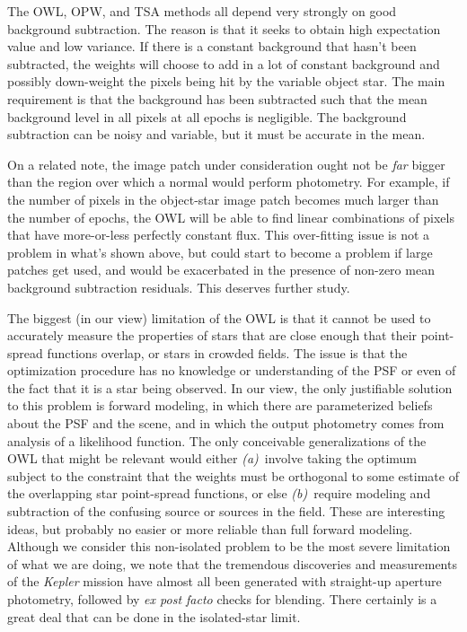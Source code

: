 \documentclass[12pt, letterpaper, preprint]{aastex}
\newcommand{\project}[1]{\textsl{#1}}
\newcommand{\foreign}[1]{\textsl{#1}}
\begin{document}
The OWL, OPW, and TSA methods all depend very strongly on good background subtraction.
The reason is that it seeks to obtain high expectation value and low variance.
If there is a constant background that hasn't been subtracted,
  the weights will choose to add in a lot of constant background
  and possibly down-weight the pixels being hit by the variable object star.
The main requirement is that the background has been subtracted such
  that the mean background level in all pixels at all epochs is negligible.
The background subtraction can be noisy and variable,
  but it must be accurate in the mean.

On a related note, the image patch under consideration ought not be \emph{far}
  bigger than the region over which a normal would perform photometry.
For example, if the number of pixels in the object-star image patch becomes
  much larger than the number of epochs,
  the OWL will be able to find linear combinations of pixels that have
  more-or-less perfectly constant flux.
This over-fitting issue is not a problem in what's shown above,
  but could start to become a problem if large patches get used,
  and would be exacerbated in the presence of non-zero mean background subtraction residuals.
This deserves further study.

The biggest (in our view) limitation of the OWL is that it cannot be used
  to accurately measure the properties of stars
  that are close enough that their point-spread functions overlap,
  or stars in crowded fields.
The issue is that the optimization procedure has no knowledge or understanding
  of the PSF or even of the fact that it is a star being observed.
In our view, the only justifiable solution to this problem is forward modeling,
  in which there are parameterized beliefs about the PSF and the scene,
  and in which the output photometry comes from analysis of a likelihood function.
The only conceivable generalizations of the OWL that might be relevant would either
  \textsl{(a)}~involve taking the optimum subject to the constraint that the weights must be
  orthogonal to some estimate of the overlapping star point-spread functions, or else
  \textsl{(b)}~require modeling and subtraction of the confusing source or sources
  in the field.
These are interesting ideas,
  but probably no easier or more reliable than full forward modeling.
Although we consider this non-isolated problem to be the most severe limitation of what we are doing,
  we note that the tremendous discoveries and measurements of the \project{Kepler} mission
  have almost all been generated with straight-up aperture photometry,
  followed by \foreign{ex post facto} checks for blending.
There certainly is a great deal that can be done in the isolated-star limit.
\end{document}
